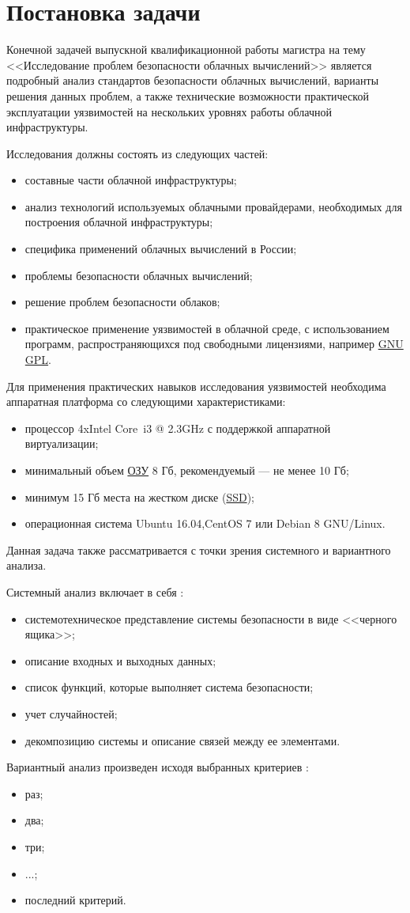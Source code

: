 \section{Постановка задачи}

Конечной задачей выпускной квалификационной работы магистра на тему <<Исследование проблем безопасности облачных вычислений>> является подробный анализ стандартов безопасности облачных вычислений, варианты решения данных проблем, а также технические возможности практической эксплуатации уязвимостей на нескольких уровнях работы облачной инфраструктуры.

Исследования должны состоять из следующих частей:
\begin{itemize}
  \item составные части облачной инфраструктуры;
  \item анализ технологий используемых облачными провайдерами, необходимых для построения облачной инфраструктуры;
  \item специфика применений облачных вычислений в России;
  \item проблемы безопасности облачных вычислений;
  \item решение проблем безопасности облаков;
  \item практическое применение уязвимостей в облачной среде, с использованием программ, распространяющихся под свободными лицензиями, например \hyperlink{gnu}{GNU} \hyperlink{gpl}{GPL}.
\end{itemize}

Для применения практических навыков исследования уязвимостей необходима аппаратная платформа со следующими характеристиками:
\begin{itemize}
  \item процессор 4xIntel Core\textregistered~i3 @ 2.3GHz с поддержкой аппаратной виртуализации;
  \item минимальный объем \hyperlink{ram}{ОЗУ} 8 Гб, рекомендуемый --- не менее 10 Гб;
  \item минимум 15 Гб места на жестком диске (\hyperlink{ssd}{SSD});
  \item операционная система Ubuntu 16.04,CentOS 7 или Debian 8 GNU/Linux.
\end{itemize}

Данная задача также рассматривается с точки зрения системного и вариантного анализа.

Системный анализ включает в себя \cite{sys-analyz}:
\begin{itemize}
  \item системотехническое представление системы безопасности в виде <<черного ящика>>;
  \item описание входных и выходных данных;
  \item список функций, которые выполняет система безопасности;
  \item учет случайностей;
  \item декомпозицию системы и описание связей между ее элементами.
\end{itemize}

Вариантный анализ произведен исходя выбранных критериев \cite{var-analyz}:
\begin{itemize}
  \item раз;
  \item два;
  \item три;
  \item ...;
  \item последний критерий.
\end{itemize}

\clearpage
